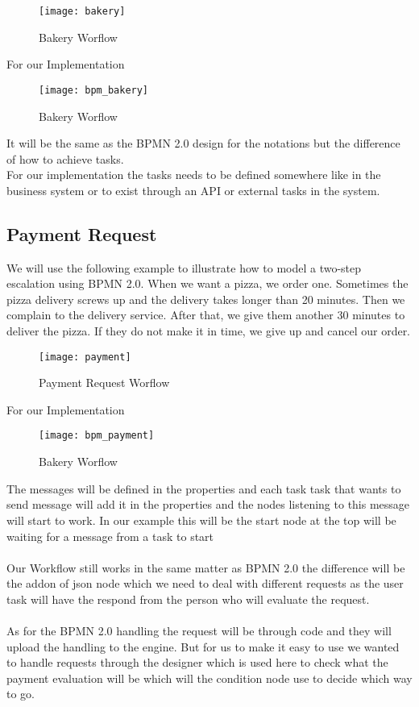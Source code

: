 \begin{figure}[h]
    \texttt{[image: bakery]}
    \centering
    \caption{Bakery Worflow}
    \label{fig:bakery}
\end{figure}

For our Implementation 
\begin{figure}[h]
    \texttt{[image: bpm\_bakery]}
    \centering
    \caption{Bakery Worflow}
    \label{fig:bpm_bakery}
\end{figure}

It will be the same as the BPMN 2.0 design for the notations but the difference of how to achieve tasks.\\
For our implementation the tasks needs to be defined somewhere like in the business system or to exist through an API or external tasks in the system.


\subsection{Payment Request}
We will use the following example to illustrate how to model a two-step escalation using BPMN 2.0.
When we want a pizza, we order one. Sometimes the pizza delivery screws up and the delivery takes
longer than 20 minutes. Then we complain to the delivery service. After that, we give them another 30
minutes to deliver the pizza. If they do not make it in time, we give up and cancel our order.

\begin{figure}[h]
    \texttt{[image: payment]}
    \centering
    \caption{Payment Request Worflow}
    \label{fig:payment}
\end{figure}

For our Implementation
\begin{figure}[h]
    \texttt{[image: bpm\_payment]}
    \centering
    \caption{Bakery Worflow}
    \label{fig:bpm_payment}
\end{figure}

The messages will be defined in the properties and each task task that wants to send message will add it  in the properties and the nodes listening to this message 
will start to work. In our example this will be the start node at the top will be waiting for a message from a task to start\\\\
Our Workflow still works in the same matter as BPMN 2.0 the difference will be the addon of json node which we need to deal with different requests 
as the user task will have the respond from the person who will evaluate the request.\\\\
As for the BPMN 2.0 handling the request will be through code and they will upload the handling to the engine. But for us to make it easy to use we wanted to handle requests 
through the designer which is used here to check what the payment evaluation will be which will the condition node use to decide which way to go.